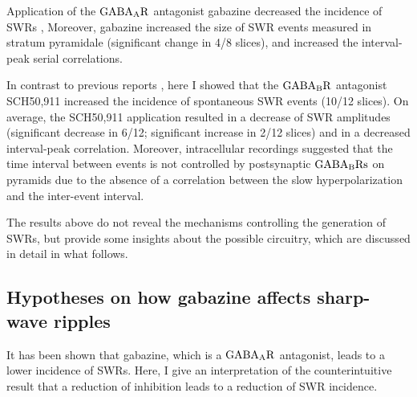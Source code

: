  Application of the $\rm GABA_AR$ antagonist gabazine decreased the incidence
  of SWRs \citep[in agreement with][]{Nimmrich2005}, Moreover, gabazine
  increased the size of SWR events measured in stratum pyramidale (significant
  change in 4/8 slices), and increased the interval-peak serial correlations. 

  In contrast to previous reports \citep[i.e.,][]{Hollnagel2014, Hofer2015},
  here I showed that the $\rm GABA_BR$ antagonist SCH50,911 increased the
  incidence of spontaneous SWR events (10/12 slices). On average, the SCH50,911
  application resulted in a decrease of SWR amplitudes (significant decrease in
  6/12; significant increase in 2/12 slices) and in a decreased interval-peak
  correlation. Moreover, intracellular recordings suggested that the time
  interval between events is not controlled by postsynaptic $\rm GABA_B Rs$ on
  pyramids due to the absence of a correlation between the slow
  hyperpolarization and the inter-event interval.

  The results above do not reveal the mechanisms controlling the generation of
  SWRs, but provide some insights about the possible circuitry, which are
  discussed in detail in what follows.
    
  \subsection{Hypotheses on how gabazine affects sharp-wave ripples} 
  \label{sec:disc_gabazine}
    It has been shown that gabazine, which is a $\rm GABA_AR$ antagonist, leads
    to a lower incidence of SWRs. Here, I give an interpretation of the
    counterintuitive result that a reduction of inhibition leads to a reduction
    of SWR incidence.

